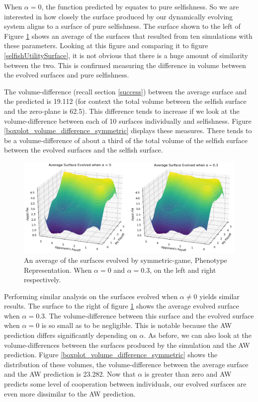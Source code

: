 \documentclass[11pt]{book}
\newcommand*{\np}{\par\noindent\newline}
\begin{document}
\np When $\alpha = 0$, the function predicted by \citet{alger_generalization_2012} equates to pure selfishness.
So we are interested in how closely the surface produced by our dynamically evolving system aligns to a surface of pure selfishness.
The surface shown to the left of Figure \ref{combined_average_symmetric_evolved} shows an average of the surfaces that resulted from ten simulations with these parameters.
Looking at this figure and comparing it to figure \ref{selfishUtilitySurface}, it is not obvious that there is a huge amount of similarity between the two.
This is confirmed measuring the difference in volume between the evolved surfaces and pure selfishness. 

\np The volume-difference (recall section \ref{success}) between the average surface and the predicted is 19.112 (for context the total volume between the selfish surface and the zero-plane is 62.5).
This difference tends to increase if we look at the volume-difference between each of 10 surfaces individually and selfishness.
Figure \ref{boxplot_volume_difference_symmetric} displays these measures.
There tends to be a volume-difference of about a third of the total volume of the selfish surface between the evolved surfaces and the selfish surface.

\begin{figure}
	\centering
	\includegraphics[scale=0.55]{resources/symmetric_average_evolved_surface_combined.png}
	\caption{An average of the surfaces evolved by symmetric-game, Phenotype Representation. When $\alpha = 0$ and $\alpha = 0.3$, on the left and right respectively.
	}
	\label{combined_average_symmetric_evolved}
\end{figure}

\np Performing similar analysis on the surfaces evolved when $\alpha \neq 0$ yields similar results.
The surface to the right of figure \ref{combined_average_symmetric_evolved} shows the average evolved surface when $\alpha = 0.3$.
The volume-difference between this surface and the evolved surface when $\alpha = 0$ is so small as to be negligible.
This is notable because the AW prediction differs significantly depending on $\alpha$.
As before, we can also look at the volume-differences between the surfaces produced by the simulation and the AW prediction.
Figure \ref{boxplot_volume_difference_symmetric} shows the distribution of these volumes, the volume-difference between the average surface and the AW prediction is 23.282.
Now that $\alpha$ is greater than zero and AW predicts some level of cooperation between individuals, our evolved surfaces are even more dissimilar to the AW prediction.
\end{document}
